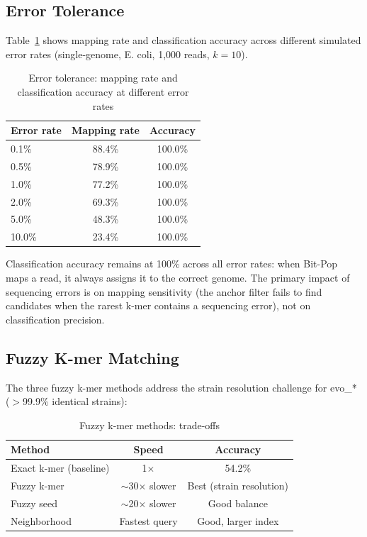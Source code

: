 \documentclass{article}
\begin{document}
\subsection{Error Tolerance}

Table~\ref{tab:error} shows mapping rate and classification accuracy across different simulated error rates (single-genome, E. coli, 1,000 reads, $k=10$).

\begin{table}[H]
\centering
\caption{Error tolerance: mapping rate and classification accuracy at different error rates}
\label{tab:error}
\begin{tabular}{lcc}
\toprule
\textbf{Error rate} & \textbf{Mapping rate} & \textbf{Accuracy} \\
\midrule
0.1\% & 88.4\% & 100.0\% \\
0.5\% & 78.9\% & 100.0\% \\
1.0\% & 77.2\% & 100.0\% \\
2.0\% & 69.3\% & 100.0\% \\
5.0\% & 48.3\% & 100.0\% \\
10.0\% & 23.4\% & 100.0\% \\
\bottomrule
\end{tabular}
\end{table}

Classification accuracy remains at 100\% across all error rates: when Bit-Pop maps a read, it always assigns it to the correct genome. The primary impact of sequencing errors is on mapping sensitivity (the anchor filter fails to find candidates when the rarest k-mer contains a sequencing error), not on classification precision.

\subsection{Fuzzy K-mer Matching}

The three fuzzy k-mer methods address the strain resolution challenge for evo\_* ($>$99.9\% identical strains):

\begin{table}[H]
\centering
\caption{Fuzzy k-mer methods: trade-offs}
\label{tab:fuzzy}
\begin{tabular}{lcc}
\toprule
\textbf{Method} & \textbf{Speed} & \textbf{Accuracy} \\
\midrule
Exact k-mer (baseline) & 1$\times$ & 54.2\% \\
Fuzzy k-mer & $\sim$30$\times$ slower & Best (strain resolution) \\
Fuzzy seed & $\sim$20$\times$ slower & Good balance \\
Neighborhood & Fastest query & Good, larger index \\
\bottomrule
\end{tabular}
\end{table}
\end{document}
